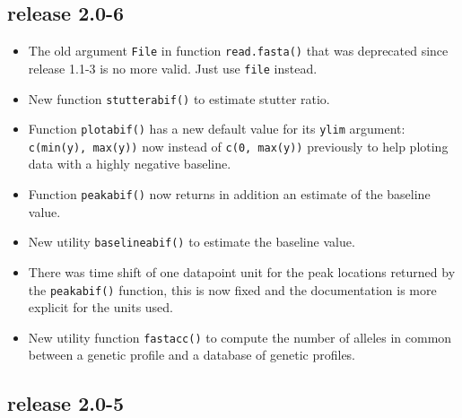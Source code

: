 \documentclass{article}
\begin{document}
\subsection*{release 2.0-6}

\begin{itemize}

\item The old argument \texttt{File} in function \texttt{read.fasta()}
that was deprecated since release 1.1-3 is no more valid.
Just use \texttt{file} instead.

\item New function \texttt{stutterabif()} to estimate stutter ratio.

\item Function \texttt{plotabif()} has a new default value for its
\texttt{ylim} argument: \texttt{c(min(y), max(y))} now instead
of \texttt{c(0, max(y))} previously to help ploting data with
a highly negative baseline.

\item Function \texttt{peakabif()} now returns in addition an estimate
of the baseline value.

\item New utility \texttt{baselineabif()} to estimate the baseline
value.

\item There was time shift of one datapoint unit for the peak locations
returned by the \texttt{peakabif()} function, this is now fixed
and the documentation is more explicit for the units used.

\item New utility function \texttt{fastacc()} to compute the number
of alleles in common between a genetic profile and a database of
genetic profiles.

\end{itemize}

\subsection*{release 2.0-5}
\end{document}
